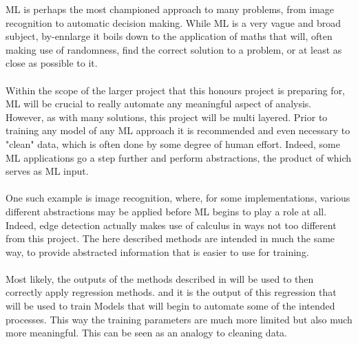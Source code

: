 \documentclass[main.tex]{subfiles}
\begin{document}
    ML is perhaps the most championed approach to many problems, from image recognition to automatic decision making. While ML is a very vague and broad subject, by-ennlarge it boils down to the application of maths that will, often making use of randomness, find the correct solution to a problem, or at least as close as possible to it.
    \\\\
    Within the scope of the larger project that this honours project is preparing for, ML will be crucial to really automate any meaningful aspect of analysis. However, as with many solutions, this project will be multi layered. Prior to training any model of any ML approach  it is recommended and even necessary to "clean" data, which is often done by some degree of human effort. Indeed, some ML applications go a step further and perform abstractions, the product of which serves as ML input. 
    \\\\
    One such example is image recognition, where, for some implementations, various different abstractions may be applied before ML begins to play a role at all. Indeed, edge detection actually makes use of calculus in ways not too different from this project. The here described methods are intended in much the same way, to provide abstracted information that is easier to use for training.
    \\\\
    Most likely, the outputs of the methods described in  will be used to then correctly apply regression methods. and it is the output of this regression that will be used to train Models that will begin to automate some of the intended processes. This way the training parameters are much more limited but also much more meaningful. This can be seen as an analogy to cleaning data. 
    
\end{document}
